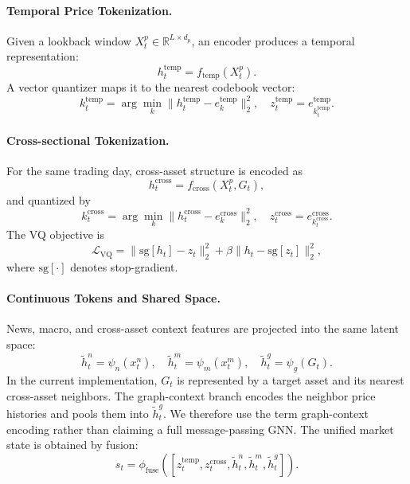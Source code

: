 \documentclass[letterpaper]{article}
\begin{document}
\paragraph{Temporal Price Tokenization.}
Given a lookback window $X_t^p \in \mathbb{R}^{L \times d_p}$, an encoder produces a temporal representation:
\begin{equation}
    h_t^{\mathrm{temp}} = f_{\mathrm{temp}}(X_t^p).
\end{equation}
A vector quantizer maps it to the nearest codebook vector:
\begin{equation}
    k_t^{\mathrm{temp}} = \arg\min_k \|h_t^{\mathrm{temp}} - e_k^{\mathrm{temp}}\|_2^2,
    \quad
    z_t^{\mathrm{temp}} = e_{k_t^{\mathrm{temp}}}^{\mathrm{temp}}.
\end{equation}

\paragraph{Cross-sectional Tokenization.}
For the same trading day, cross-asset structure is encoded as
\begin{equation}
    h_t^{\mathrm{cross}} = f_{\mathrm{cross}}(X_t^p, G_t),
\end{equation}
and quantized by
\begin{equation}
    k_t^{\mathrm{cross}} = \arg\min_k \|h_t^{\mathrm{cross}} - e_k^{\mathrm{cross}}\|_2^2,
    \quad
    z_t^{\mathrm{cross}} = e_{k_t^{\mathrm{cross}}}^{\mathrm{cross}}.
\end{equation}
The VQ objective is
\begin{equation}
    \mathcal{L}_{\mathrm{VQ}} =
    \| \mathrm{sg}[h_t] - z_t \|_2^2
    + \beta \| h_t - \mathrm{sg}[z_t] \|_2^2,
\end{equation}
where $\mathrm{sg}[\cdot]$ denotes stop-gradient.

\paragraph{Continuous Tokens and Shared Space.}
News, macro, and cross-asset context features are projected into the same latent space:
\begin{equation}
    \tilde{h}_t^n = \psi_n(x_t^n), \quad
    \tilde{h}_t^m = \psi_m(x_t^m), \quad
    \tilde{h}_t^g = \psi_g(G_t).
\end{equation}
In the current implementation, $G_t$ is represented by a target asset and its nearest cross-asset neighbors. The graph-context branch encodes the neighbor price histories and pools them into $\tilde{h}_t^g$. We therefore use the term graph-context encoding rather than claiming a full message-passing GNN.
The unified market state is obtained by fusion:
\begin{equation}
    s_t = \phi_{\mathrm{fuse}}\left(
    [z_t^{\mathrm{temp}}, z_t^{\mathrm{cross}}, \tilde{h}_t^n, \tilde{h}_t^m, \tilde{h}_t^g]
    \right).
\end{equation}
\end{document}
